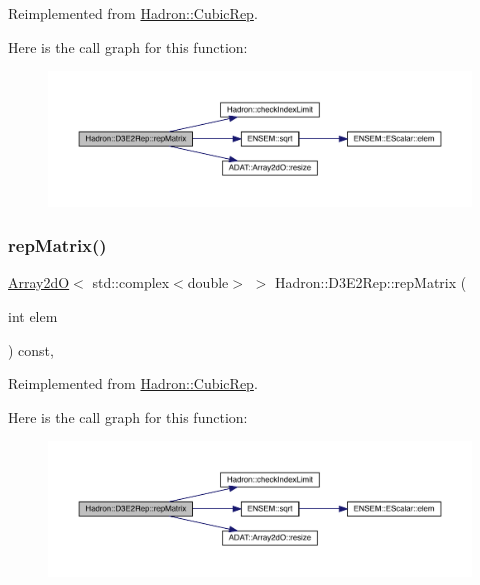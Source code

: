 Reimplemented from \mbox{\hyperlink{structHadron_1_1CubicRep_ac5d7e9e6f4ab1158b5fce3e4ad9e8005}{Hadron\+::\+Cubic\+Rep}}.

Here is the call graph for this function\+:
\nopagebreak
\begin{figure}[H]
\begin{center}
\leavevmode
\includegraphics[width=350pt]{db/de8/structHadron_1_1D3E2Rep_a941daa264ff6a6495a1bb521abe9021b_cgraph}
\end{center}
\end{figure}
\mbox{\label{structHadron_1_1D3E2Rep_a941daa264ff6a6495a1bb521abe9021b}} 
\subsubsection{\texorpdfstring{repMatrix()}{repMatrix()}\hspace{0.1cm}{\footnotesize\ttfamily [3/3]}}
{\footnotesize\ttfamily \mbox{\hyperlink{classADAT_1_1Array2dO}{Array2dO}}$<$ std\+::complex$<$double$>$ $>$ Hadron\+::\+D3\+E2\+Rep\+::rep\+Matrix (\begin{DoxyParamCaption}\item[{int}]{elem }\end{DoxyParamCaption}) const\hspace{0.3cm}{\ttfamily [inline]}, {\ttfamily [virtual]}}



Reimplemented from \mbox{\hyperlink{structHadron_1_1CubicRep_ac5d7e9e6f4ab1158b5fce3e4ad9e8005}{Hadron\+::\+Cubic\+Rep}}.

Here is the call graph for this function\+:
\nopagebreak
\begin{figure}[H]
\begin{center}
\leavevmode
\includegraphics[width=350pt]{db/de8/structHadron_1_1D3E2Rep_a941daa264ff6a6495a1bb521abe9021b_cgraph}
\end{center}
\end{figure}


